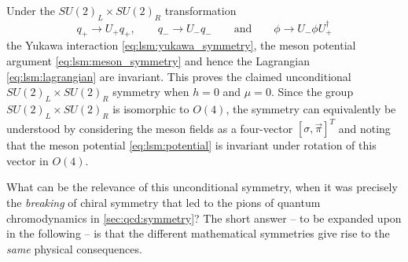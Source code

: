 Under the $SU(2)_L \times SU(2)_R$ transformation 
\begin{equation}
	q_+ \rightarrow U_+ q_+, \qquad
	q_- \rightarrow U_- q_-
	\qquad \text{and} \qquad
	\phi   \rightarrow U_- \phi U_+^\dagger
\end{equation}
the Yukawa interaction \eqref{eq:lsm:yukawa_symmetry},
the meson potential argument \eqref{eq:lsm:meson_symmetry}
and hence the Lagrangian \eqref{eq:lsm:lagrangian} are invariant.
This proves the claimed unconditional $SU(2)_L \times SU(2)_R$ symmetry when $h=0$ and $\mu=0$.
Since the group $SU(2)_L \times SU(2)_R$ is isomorphic to $O(4)$,
the symmetry can equivalently be understood by considering the meson fields as a four-vector $[\sigma, \vec{\pi}]^T$
and noting that the meson potential \eqref{eq:lsm:potential} is invariant under rotation of this vector in $O(4)$.

What can be the relevance of this unconditional symmetry,
when it was precisely the \emph{breaking} of chiral symmetry that led to the pions of quantum chromodynamics in \cref{sec:qcd:symmetry}?
The short answer -- to be expanded upon in the following -- is that the different mathematical symmetries give rise to the \emph{same} physical consequences.

